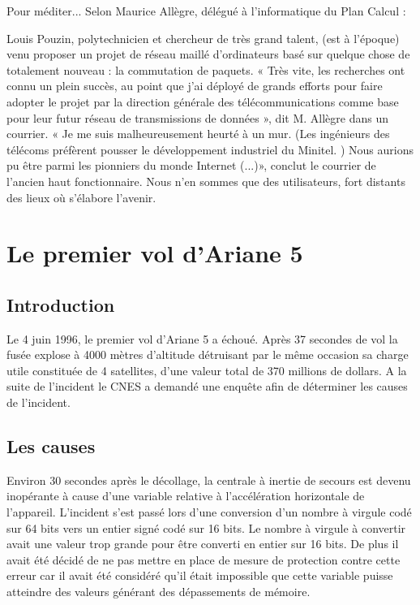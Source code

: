 \documentclass[12pt]{report}
\begin{document}
Pour méditer... Selon Maurice Allègre, délégué à l'informatique du Plan Calcul :

\og Louis Pouzin, polytechnicien et chercheur de très grand talent, (est à l'époque) venu proposer un projet de réseau maillé d'ordinateurs basé sur quelque chose de totalement nouveau : la commutation de paquets. « Très vite, les recherches ont connu un plein succès, au point que j'ai déployé de grands efforts pour faire adopter le projet par la direction générale des télécommunications comme base pour leur futur réseau de transmissions de données », dit M. Allègre dans un courrier. « Je me suis malheureusement heurté à un mur. (Les ingénieurs des télécoms préfèrent pousser le développement industriel du Minitel. ) Nous aurions pu être parmi les pionniers du monde Internet (...)», conclut le courrier de l'ancien haut fonctionnaire. Nous n'en sommes que des utilisateurs, fort distants des lieux où s'élabore l'avenir. \fg\cite{wikipouzin}


\chapter{Le premier vol d'Ariane 5}

\section{Introduction}

Le 4 juin 1996, le premier vol d'Ariane 5 a échoué. Après 37 secondes de vol la fusée explose à 4000 mètres d'altitude 
détruisant par le même occasion sa charge utile constituée de 4 satellites, d'une valeur total de 370 millions de dollars.
A la suite de l'incident le CNES a demandé une enquête afin de déterminer les causes de l'incident.

\section{Les causes}

Environ 30 secondes après le décollage, la centrale à inertie de secours est devenu inopérante à cause d'une variable relative à l'accélération horizontale de l'appareil. L'incident s'est passé lors d'une conversion    
d'un nombre à virgule codé sur 64 bits vers un entier signé codé sur 16 bits. Le nombre à virgule à convertir avait une valeur trop grande pour être converti en entier sur 16 bits. De plus il avait été décidé de ne pas mettre en place de mesure de protection contre cette erreur car il avait été considéré qu'il était impossible que cette variable puisse atteindre des valeurs générant des dépassements de mémoire.
\end{document}
